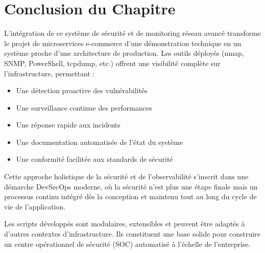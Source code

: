 \section{Conclusion du Chapitre}

L'intégration de ce système de sécurité et de monitoring réseau avancé transforme le projet de microservices e-commerce d'une démonstration technique en un système proche d'une architecture de production. Les outils déployés (nmap, SNMP, PowerShell, tcpdump, etc.) offrent une visibilité complète sur l'infrastructure, permettant :

\begin{itemize}
    \item Une détection proactive des vulnérabilités
    \item Une surveillance continue des performances
    \item Une réponse rapide aux incidents
    \item Une documentation automatisée de l'état du système
    \item Une conformité facilitée aux standards de sécurité
\end{itemize}

Cette approche holistique de la sécurité et de l'observabilité s'inscrit dans une démarche DevSecOps moderne, où la sécurité n'est plus une étape finale mais un processus continu intégré dès la conception et maintenu tout au long du cycle de vie de l'application.

Les scripts développés sont modulaires, extensibles et peuvent être adaptés à d'autres contextes d'infrastructure. Ils constituent une base solide pour construire un centre opérationnel de sécurité (SOC) automatisé à l'échelle de l'entreprise.
